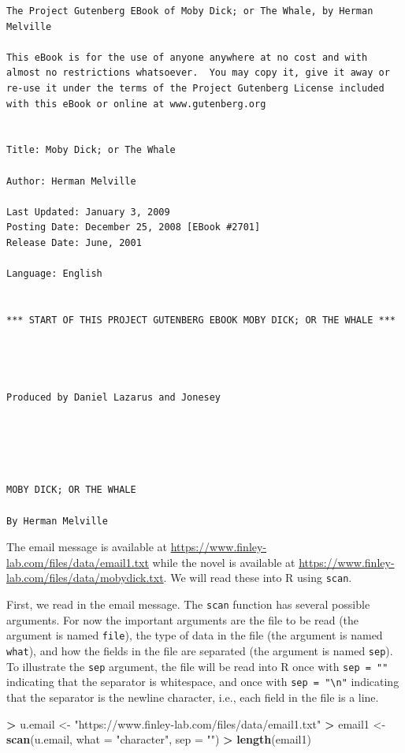 \documentclass[
]{krantz}
\makeatletter
\newenvironment{Shaded}{\begin{snugshade}}{\end{snugshade}}
\newcommand{\DataTypeTok}[1]{\textcolor[rgb]{0.27,0.27,0.27}{#1}}
\newcommand{\KeywordTok}[1]{\textcolor[rgb]{0.27,0.27,0.27}{\textbf{#1}}}
\newcommand{\NormalTok}[1]{#1}
\newcommand{\OperatorTok}[1]{\textcolor[rgb]{0.43,0.43,0.43}{\textbf{#1}}}
\newcommand{\StringTok}[1]{\textcolor[rgb]{0.5,0.5,0.5}{#1}}
\newenvironment{kframe}{%
\medskip{}
\setlength{\fboxsep}{.8em}
 \def\at@end@of@kframe{}%
 \ifinner\ifhmode%
  \def\at@end@of@kframe{\end{minipage}}%
  \begin{minipage}{\columnwidth}%
 \fi\fi%
 \def\FrameCommand##1{\hskip\@totalleftmargin \hskip-\fboxsep
 \colorbox{shadecolor}{##1}\hskip-\fboxsep
     \hskip-\linewidth \hskip-\@totalleftmargin \hskip\columnwidth}%
 \MakeFramed {\advance\hsize-\width
   \@totalleftmargin\z@ \linewidth\hsize
   \@setminipage}}%
 {\par\unskip\endMakeFramed%
 \at@end@of@kframe}
\renewenvironment{Shaded}{\begin{kframe}}{\end{kframe}}
\makeatother
\begin{document}
\begin{verbatim}
The Project Gutenberg EBook of Moby Dick; or The Whale, by Herman Melville

This eBook is for the use of anyone anywhere at no cost and with
almost no restrictions whatsoever.  You may copy it, give it away or
re-use it under the terms of the Project Gutenberg License included
with this eBook or online at www.gutenberg.org


Title: Moby Dick; or The Whale

Author: Herman Melville

Last Updated: January 3, 2009
Posting Date: December 25, 2008 [EBook #2701]
Release Date: June, 2001

Language: English


*** START OF THIS PROJECT GUTENBERG EBOOK MOBY DICK; OR THE WHALE ***




Produced by Daniel Lazarus and Jonesey





MOBY DICK; OR THE WHALE

By Herman Melville
\end{verbatim}

The email message is available at \url{https://www.finley-lab.com/files/data/email1.txt} while the novel is available at \url{https://www.finley-lab.com/files/data/mobydick.txt}. We will read these into R using \texttt{scan}.

First, we read in the email message. The \texttt{scan} function has several possible arguments. For now the important arguments are the file to be read (the argument is named \texttt{file}), the type of data in the file (the argument is named \texttt{what}), and how the fields in the file are separated (the argument is named \texttt{sep}). To illustrate the \texttt{sep} argument, the file will be read into R once with \texttt{sep\ =\ ""} indicating that the separator is whitespace, and once with \texttt{sep\ =\ "\textbackslash{}n"} indicating that the separator is the newline character, i.e., each field in the file is a line.

\begin{Shaded}
\begin{Highlighting}[]
\OperatorTok{\textgreater{}}\StringTok{ }\NormalTok{u.email \textless{}{-}}\StringTok{ "https://www.finley{-}lab.com/files/data/email1.txt"}
\OperatorTok{\textgreater{}}\StringTok{ }\NormalTok{email1 \textless{}{-}}\StringTok{ }\KeywordTok{scan}\NormalTok{(u.email, }\DataTypeTok{what =} \StringTok{"character"}\NormalTok{, }\DataTypeTok{sep =} \StringTok{""}\NormalTok{)}
\OperatorTok{\textgreater{}}\StringTok{ }\KeywordTok{length}\NormalTok{(email1)}
\end{Highlighting}
\end{Shaded}
\end{document}
